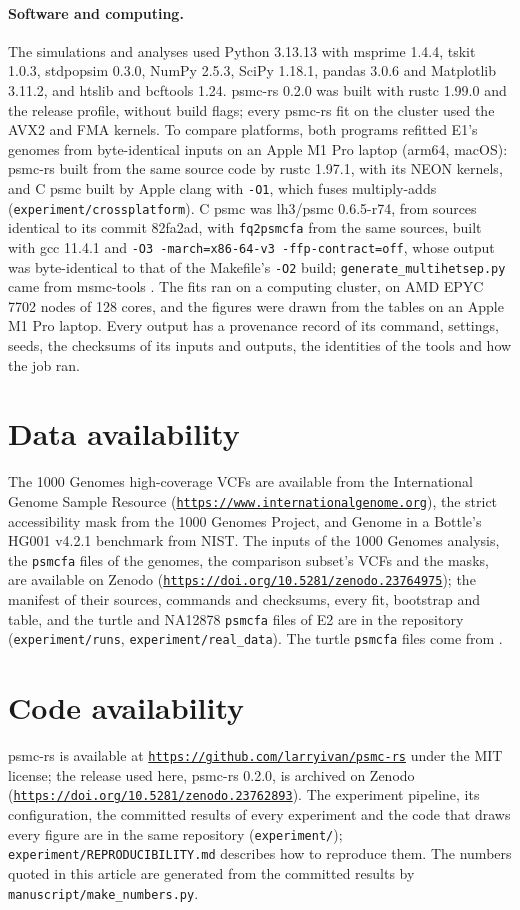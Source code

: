 \documentclass[11pt]{article}
\newcommand{\psmcrs}{psmc-rs}
\newcommand{\wholeurl}[1]{\href{#1}{\mbox{\nolinkurl{#1}}}}
\newcommand{\splitturl}[2]{\href{#1#2}{\mbox{\nolinkurl{#1}}\allowbreak\mbox{\nolinkurl{#2}}}}
\begin{document}
\paragraph{Software and computing.} The simulations and analyses used Python 3.13.13 with msprime 1.4.4, tskit 1.0.3, stdpopsim 0.3.0, NumPy 2.5.3, SciPy 1.18.1, pandas 3.0.6 and Matplotlib 3.11.2, and htslib and bcftools 1.24. \psmcrs{} 0.2.0 was built with rustc 1.99.0 and the release profile, without build flags; every \psmcrs{} fit on the cluster used the AVX2 and FMA kernels. To compare platforms, both programs refitted E1's genomes from byte-identical inputs on an Apple M1 Pro laptop (arm64, macOS): \psmcrs{} built from the same source code by rustc 1.97.1, with its NEON kernels, and C psmc built by Apple clang with \texttt{-O1}, which fuses multiply-adds (\texttt{experiment/crossplatform}). C psmc was lh3/psmc 0.6.5-r74, from sources identical to its commit 82fa2ad, with \texttt{fq2psmcfa} from the same sources, built with gcc 11.4.1 and \texttt{-O3 -march=x86-64-v3 -ffp-contract=off}, whose output was byte-identical to that of the Makefile's \texttt{-O2} build; \texttt{generate\_\allowbreak multihetsep.py} came from msmc-tools \citep{msmctools}. The fits ran on a computing cluster, on AMD EPYC 7702 nodes of 128 cores, and the figures were drawn from the tables on an Apple M1 Pro laptop. Every output has a provenance record of its command, settings, seeds, the checksums of its inputs and outputs, the identities of the tools and how the job ran.

\section*{Data availability}
The 1000 Genomes high-coverage VCFs are available from the International Genome Sample Resource (\wholeurl{https://www.internationalgenome.org}), the strict accessibility mask from the 1000 Genomes Project, and Genome in a Bottle's HG001 v4.2.1 benchmark from NIST. The inputs of the 1000 Genomes analysis, the \texttt{psmcfa} files of the \EsevenGenomes{} genomes, the comparison subset's VCFs and the masks, are available on Zenodo (\splitturl{https://doi.org/10.5281/}{zenodo.23764975}); the manifest of their sources, commands and checksums, every fit, bootstrap and table, and the turtle and NA12878 \texttt{psmcfa} files of E2 are in the repository (\texttt{experiment/runs}, \texttt{experiment/real\_data}). The turtle \texttt{psmcfa} files come from \citet{hilgers2025}.

\section*{Code availability}
\psmcrs{} is available at \wholeurl{https://github.com/larryivan/psmc-rs} under the MIT license; the release used here, \psmcrs{} 0.2.0, is archived on Zenodo (\splitturl{https://doi.org/10.5281/}{zenodo.23762893}). The experiment pipeline, its configuration, the committed results of every experiment and the code that draws every figure are in the same repository (\texttt{experiment/}); \texttt{experiment/REPRODUCIBILITY.md} describes how to reproduce them. The numbers quoted in this article are generated from the committed results by \texttt{manuscript/make\_numbers.py}.
\end{document}
